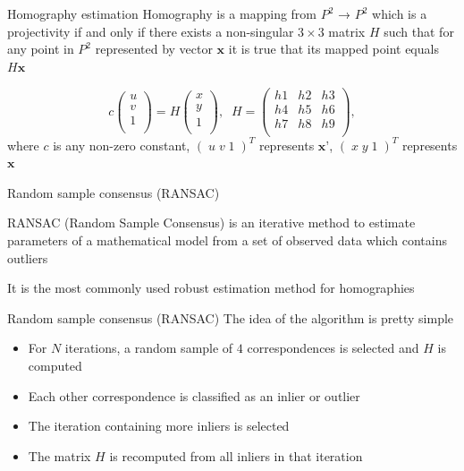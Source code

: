 \documentclass{beamer}
\begin{document}
\begin{frame}{Homography estimation}
  Homography is a mapping from $P^2$ → $P^2$ which is a projectivity if and only if there exists a non-singular $3\times3$ matrix $H$ such that for any point in $P^2$ represented by vector $\textbf{x}$ it is true that its mapped point equals $H\textbf{x}$

  $$c\begin{pmatrix}u\\ v\\ 1\\\end{pmatrix} = H\begin{pmatrix}x\\ y\\ 1\\\end{pmatrix}, \;\; H=\begin{pmatrix}h1 & h2 & h3\\ h4 & h5 & h6\\ h7 & h8 & h9\\\end{pmatrix},$$
  where $c$ is any non-zero constant, $(\; u \; v \; 1 \;)^T$ represents $\textbf{x'}$, $(\; x \; y \; 1 \;)^T$ represents $\textbf{x}$
\end{frame}
\begin{frame}{Random sample consensus (RANSAC)}
  \begin{block}{}
      RANSAC (Random Sample Consensus) is an iterative method to estimate parameters of a mathematical model from a set of observed data which contains outliers
  \end{block}
  \begin{block}{}
      It is the most commonly used robust estimation method for homographies
  \end{block}
\end{frame}
\begin{frame}{Random sample consensus (RANSAC)}
  The idea of the algorithm is pretty simple
  \pause
  \begin{itemize}
    \item<2-> For $N$ iterations, a random sample of $4$ correspondences is selected and $H$ is computed
    \item<3-> Each other correspondence is classified as an inlier or outlier
    \item<4-> The iteration containing more inliers is selected
    \item<5-> The matrix $H$ is recomputed from all inliers in that iteration
  \end{itemize}
\end{frame}
\end{document}
